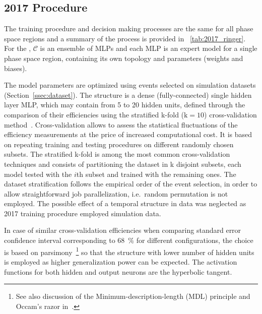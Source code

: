 \subsection{2017 Procedure}\label{ssec:2017}

The training procedure and decision making processes are the same for all phase
space regions and a summary of the process is provided in
\tablename~\ref{tab:2017_ringer}. For the \rnn{}, $\mathcal{C}$ is an ensemble of
MLPs and each MLP is an expert model for a single phase space
region, containing its own topology and parameters (weights and biases).

The model parameters are optimized using events selected on simulation datasets
(Section~\ref{ssec:dataset}). The structure is a dense (fully-connected) single
hidden layer MLP, which may contain from 5 to 20 hidden units, defined through
the comparison of their efficiencies using the stratified k-fold ($\text{k}=10$)
cross-validation method~\cite{haykin_2008}. Cross-validation allows to assess the statistical fluctuations of the efficiency measurements 
at the price of increased computational cost. It is
based on repeating training and testing procedures on different
randomly chosen subsets. The stratified k-fold is
among the most common cross-validation techniques and consists of partitioning
the dataset in k disjoint subsets, each model tested with the $i$th subset and
trained with the remaining ones. The dataset stratification follows the
empirical order of the event selection, in order to allow straightforward job
parallelization, i.e.\ random permutation is not employed. The possible effect
of a temporal structure in data was neglected as 2017 training procedure
employed simulation data.

In case of similar cross-validation efficiencies when comparing standard
error confidence interval corresponding to \SI{68}{\%} for different
configurations, the choice is based on
parsimony~\cite{medeiros2001statistical}\footnote{See also discussion of the
  Minimum-description-length (MDL) principle and Occam's razor
in~\cite{haykin_2008}.} so that the structure with lower number of hidden units
is employed as higher generalization power can be expected. The activation
functions for both hidden and output neurons are the hyperbolic tangent.





